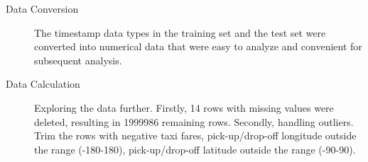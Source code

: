 \documentclass{tikzposter} %
\begin{document}
\begin{columns}
{\begin{description}
    \item[Data Conversion]
    The timestamp data types in the training set and the test set were converted into numerical data that were easy to analyze and convenient for subsequent analysis.
    \item[Data Calculation]
    Exploring the data further. Firstly, 14 rows with missing values were deleted, resulting in 1999986 remaining rows. Secondly, handling outliers. Trim the rows with negative taxi fares, pick-up/drop-off longitude outside the range (-180-180), pick-up/drop-off latitude outside the range (-90-90).
\end{description}




}
\end{columns}
\end{document}
